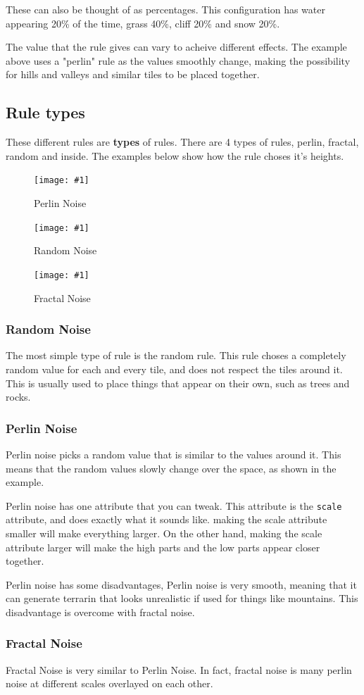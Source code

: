 \documentclass{book}
\newcommand{\hFigure}[2]
	{\begin{figure}[ht!]
		\centering
		\texttt{[image: \#1]}
		\caption{#2}
	\end{figure}}
\begin{document}
These can also be thought of as percentages. This configuration has water appearing 20\% of the time, grass 40\%, cliff 20\% and snow 20\%.

The value that the rule gives can vary to acheive different effects. The example above uses a "perlin" rule as the values smoothly change, making the possibility for hills and valleys and similar tiles to be placed together. 

\subsection{Rule types}
These different rules are \textbf{types} of rules. There are 4 types of rules, perlin, fractal, random and inside. The examples below show how the rule choses it's heights.

\hFigure{PerlinNoiseExample.png}{Perlin Noise}

\hFigure{WhiteNoiseExample.png}{Random Noise}

\hFigure{FractalNoise.jpg}{Fractal Noise}

\subsubsection{Random Noise}
The most simple type of rule is the random rule. This rule choses a completely random value for each and every tile, and does not respect the tiles around it. This is usually used to place things that appear on their own, such as trees and rocks.

\subsubsection{Perlin Noise}
Perlin noise picks a random value that is similar to the values around it. This means that the random values slowly change over the space, as shown in the example.

Perlin noise has one attribute that you can tweak. This attribute is the \texttt{scale} attribute, and does exactly what it sounds like. making the scale attribute smaller will make everything larger. On the other hand, making the scale attribute larger will make the high parts and the low parts appear closer together.

Perlin noise has some disadvantages, Perlin noise is very smooth, meaning that it can generate terrarin that looks unrealistic if used for things like mountains. This disadvantage is overcome with fractal noise.

\subsubsection{Fractal Noise}
Fractal Noise is very similar to Perlin Noise. In fact, fractal noise is many perlin noise at different scales overlayed on each other.
\end{document}
